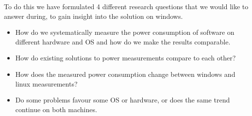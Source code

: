 To do this we have formulated 4 different research questions that we would like to answer during, to gain insight into the solution on windows.

\begin{itemize}
    \item How do we systematically measure the power consumption of software on different hardware and OS and how do we make the results comparable.
    \item How do existing solutions to power measurements compare to each other?
    \item How does the measured power consumption change between windows and linux measurements?
    \item Do some problems favour some OS or hardware, or does the same trend continue on both machines.
\end{itemize}
